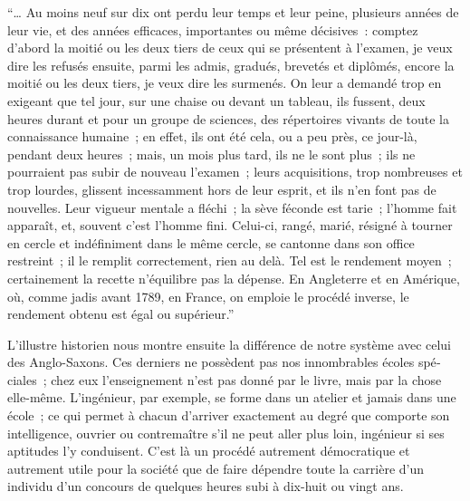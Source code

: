 \documentclass[french,twoside]{book} %
\begin{document}
“… Au moins neuf sur dix ont perdu leur temps et leur peine, plusieurs années de leur vie, et des années efficaces, importantes ou même décisives : comptez d’abord la moitié ou les deux tiers de ceux qui se présentent à l’examen, je veux dire les refusés ­ensuite, parmi les admis, gradués, brevetés et diplômés, encore la moitié ou les deux tiers, je veux dire les surmenés. On leur a demandé trop en exigeant que tel jour, sur une chaise ou devant un tableau, ils fussent, deux heures durant et pour un groupe de sciences, des répertoires vivants de toute la connaissance humaine ; en effet, ils ont été cela, ou a peu près, ce jour-là, pendant deux heures ; mais, un mois plus tard, ils ne le sont plus ; ils ne pourraient pas subir de nouveau l’examen ; leurs acquisitions, trop nombreuses et trop lourdes, glissent incessamment hors de leur esprit, et ils n’en font pas de nouvelles. Leur vigueur mentale a fléchi ; la sève féconde est tarie ; l’hom­me fait apparaît, et, souvent c’est l’homme fini. Celui-ci, rangé, marié, résigné à tour­ner en cercle et indéfiniment dans le même cercle, se cantonne dans son office restreint ; il le remplit correctement, rien au delà. Tel est le rendement moyen ; certainement la recette n’équilibre pas la dépense. En Angleterre et en Amérique, où, comme jadis avant 1789, en France, on emploie le procédé inverse, le rendement obtenu est égal ou supérieur.”\par
L’illustre historien nous montre ensuite la différence de notre système avec celui des Anglo-Saxons. Ces derniers ne possèdent pas nos innombrables écoles spé­ciales ; chez eux l’enseignement n’est pas donné par le livre, mais par la chose elle-même. L’ingénieur, par exemple, se forme dans un atelier et jamais dans une école ; ce qui permet à chacun d’arriver exactement au degré que comporte son intelligence, ouvrier ou contremaître s’il ne peut aller plus loin, ingénieur si ses aptitudes l’y conduisent. C’est là un procédé autrement démocratique et autrement utile pour la société que de faire dépendre toute la carrière d’un individu d’un concours de quelques heures subi à dix-­huit ou vingt ans.\par
\end{document}
